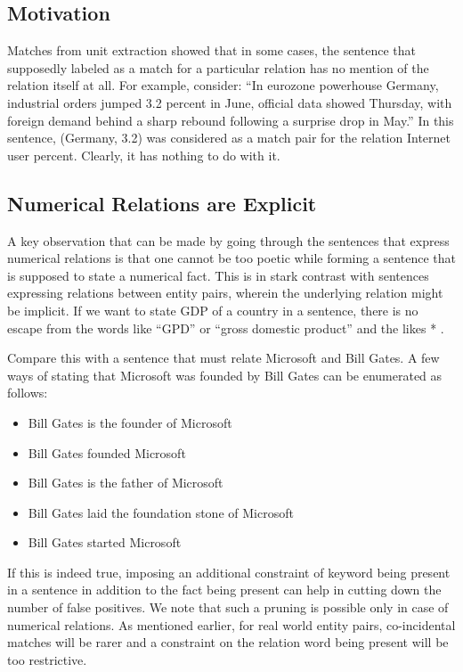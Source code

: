 \documentclass[a4paper,10pt]{article}
\begin{document}
\subsection{Motivation}
Matches from unit extraction showed that in some cases, the sentence that supposedly labeled as a
match for a particular relation has no mention of the relation itself at all.
For example, consider:
“In eurozone powerhouse Germany, industrial orders jumped 3.2 percent in June, official data
showed Thursday, with foreign demand behind a sharp rebound following a surprise drop in May.”
In this sentence, (Germany, 3.2) was considered as a match pair for the relation Internet user
percent. Clearly, it has nothing to do with it.

\subsection{Numerical Relations are Explicit}
A key observation that can be made by going through the sentences that express numerical relations
is that one cannot be too poetic while forming a sentence that is supposed to state a numerical fact.
This is in stark contrast with sentences expressing relations between entity pairs, wherein the
underlying relation might be implicit. If we want to state GDP of a country in a sentence, there is no
escape from the words like “GPD” or “gross domestic product” and the likes * .

Compare this with a sentence that must relate Microsoft and Bill Gates. A few ways of stating that
Microsoft was founded by Bill Gates can be enumerated as follows:
\begin{itemize}
\item Bill Gates is the founder of Microsoft
\item Bill Gates founded Microsoft
\item Bill Gates is the father of Microsoft
\item Bill Gates laid the foundation stone of Microsoft
\item Bill Gates started Microsoft
\end{itemize}

If this is indeed true, imposing an additional constraint of keyword being present in a sentence in
addition to the fact being present can help in cutting down the number of false positives. We note
that such a pruning is possible only in case of numerical relations. As mentioned earlier, for real
world entity pairs, co-incidental matches will be rarer and a constraint on the relation word being
present will be too restrictive.
\end{document}
